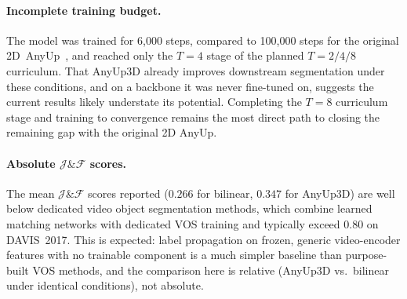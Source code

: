 \paragraph{Incomplete training budget.}
The model was trained for 6{,}000 steps, compared to 100{,}000 steps for the original 2D~AnyUp~\cite{anyup}, and reached only the $T\!=\!4$ stage of the planned $T\!=\!2/4/8$ curriculum.
That AnyUp3D already improves downstream segmentation under these conditions, and on a backbone it was never fine-tuned on, suggests the current results likely understate its potential.
Completing the $T\!=\!8$ curriculum stage and training to convergence remains the most direct path to closing the remaining gap with the original 2D AnyUp.

\paragraph{Absolute $\mathcal{J}\&\mathcal{F}$ scores.}
The mean $\mathcal{J}\&\mathcal{F}$ scores reported ($0.266$ for bilinear, $0.347$ for AnyUp3D) are well below dedicated video object segmentation methods, which combine learned matching networks with dedicated VOS training and typically exceed $0.80$ on DAVIS~2017.
This is expected: label propagation on frozen, generic video-encoder features with no trainable component is a much simpler baseline than purpose-built VOS methods, and the comparison here is relative (AnyUp3D vs.\ bilinear under identical conditions), not absolute.